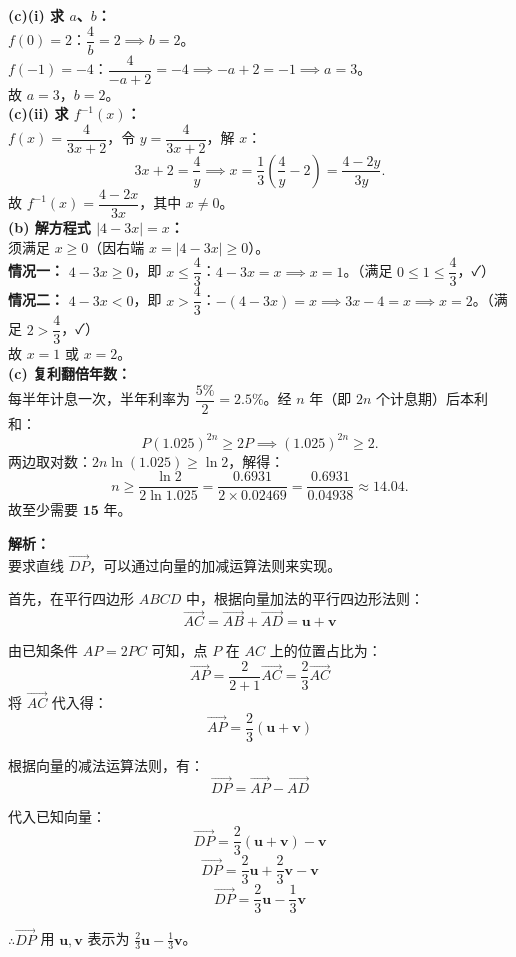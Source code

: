 \documentclass[12pt,a4paper]{exam-zh}
\begin{document}
\begin{solution}
    \textbf{(c)(i) 求 $a$、$b$：} \\
    $f(0) = 2$：$\dfrac{4}{b} = 2 \implies b = 2$。\\
    $f(-1) = -4$：$\dfrac{4}{-a+2} = -4 \implies -a+2 = -1 \implies a = 3$。\\
    故 $a = 3$，$b = 2$。\\
 
    \textbf{(c)(ii) 求 $f^{-1}(x)$：} \\
    $f(x) = \dfrac{4}{3x+2}$，令 $y = \dfrac{4}{3x+2}$，解 $x$：
    \[
        3x+2 = \frac{4}{y} \implies x = \frac{1}{3}\!\left(\frac{4}{y}-2\right) = \frac{4-2y}{3y}.
    \]
    故 $f^{-1}(x) = \dfrac{4-2x}{3x}$，其中 $x \ne 0$。\\

    \textbf{(b) 解方程式 $|4-3x| = x$：} \\
    须满足 $x \ge 0$（因右端 $x = |4-3x| \ge 0$）。 \\
    \textbf{情况一：} $4 - 3x \ge 0$，即 $x \le \dfrac{4}{3}$：$4 - 3x = x \implies x = 1$。（满足 $0 \le 1 \le \dfrac{4}{3}$，✓）\\
    \textbf{情况二：} $4 - 3x < 0$，即 $x > \dfrac{4}{3}$：$-(4-3x) = x \implies 3x - 4 = x \implies x = 2$。（满足 $2 > \dfrac{4}{3}$，✓）\\
    故 $x = 1$ 或 $x = 2$。 \\

    \textbf{(c) 复利翻倍年数：} \\
    每半年计息一次，半年利率为 $\dfrac{5\%}{2} = 2.5\%$。经 $n$ 年（即 $2n$ 个计息期）后本利和：
    \[
        P(1.025)^{2n} \ge 2P \implies (1.025)^{2n} \ge 2.
    \]
    两边取对数：$2n \ln(1.025) \ge \ln 2$，解得：
    \[
        n \ge \frac{\ln 2}{2\ln 1.025} = \frac{0.6931}{2 \times 0.02469} = \frac{0.6931}{0.04938} \approx 14.04.
    \]
    故至少需要 $\mathbf{15}$ 年。


    \textbf{解析：} \\
    要求直线 $\overrightarrow{DP}$，可以通过向量的加减运算法则来实现。
    
    首先，在平行四边形 $ABCD$ 中，根据向量加法的平行四边形法则：
    \[ \overrightarrow{AC} = \overrightarrow{AB} + \overrightarrow{AD} = \mathbf{u} + \mathbf{v} \]
    
    由已知条件 $AP = 2PC$ 可知，点 $P$ 在 $AC$ 上的位置占比为：
    \[ \overrightarrow{AP} = \frac{2}{2+1}\overrightarrow{AC} = \frac{2}{3}\overrightarrow{AC} \]
    将 $\overrightarrow{AC}$ 代入得：
    \[ \overrightarrow{AP} = \frac{2}{3}(\mathbf{u} + \mathbf{v}) \]
    
    根据向量的减法运算法则，有：
    \[ \overrightarrow{DP} = \overrightarrow{AP} - \overrightarrow{AD} \]
    
    代入已知向量：
    \[ \overrightarrow{DP} = \frac{2}{3}(\mathbf{u} + \mathbf{v}) - \mathbf{v} \]
    \[ \overrightarrow{DP} = \frac{2}{3}\mathbf{u} + \frac{2}{3}\mathbf{v} - \mathbf{v} \]
    \[ \overrightarrow{DP} = \frac{2}{3}\mathbf{u} - \frac{1}{3}\mathbf{v} \]
    
    $\therefore \overrightarrow{DP}$ 用 $\mathbf{u}, \mathbf{v}$ 表示为 $\displaystyle \frac{2}{3}\mathbf{u} - \frac{1}{3}\mathbf{v}$。
\end{solution}
\end{document}
